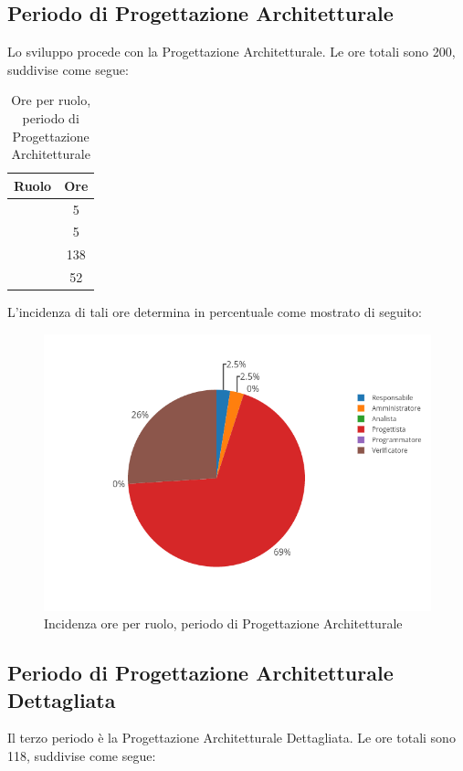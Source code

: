 \subsection{Periodo di Progettazione Architetturale}
Lo sviluppo procede con la Progettazione Architetturale. Le ore totali sono 200, suddivise come segue:

\begin{table}[H]
	\begin{center}
		\begin{tabular}{|c|c|}
			\hline
			\textbf{Ruolo}	& \textbf{Ore} \\
			\hline
			\Res	&	5	\\
			\hline
			\Amm	&	5	\\
			\hline
			\Prog   &	138	\\
			\hline
			\Ver	&	52	\\
			\hline
		\end{tabular}
	\end{center}
	\caption{Ore per ruolo, periodo di Progettazione Architetturale}
\end{table}

L'incidenza di tali ore determina in percentuale come mostrato di seguito:
\begin{figure}[H]
	\centering
	\includegraphics[scale=0.6]{img/ProgettazioneArchitetturale.png}
	\caption{Incidenza ore per ruolo, periodo di Progettazione Architetturale}
\end{figure}

\subsection{Periodo di Progettazione Architetturale Dettagliata}
Il terzo periodo è la Progettazione Architetturale Dettagliata. Le ore totali sono 118, suddivise come segue:

